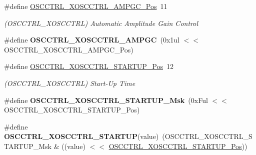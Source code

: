 \begin{DoxyCompactItemize}
\item 
\hypertarget{group___s_a_m_l21___o_s_c_c_t_r_l_gaa8295ae40610c6b9181afdd65394fee4}{}\#define \hyperlink{group___s_a_m_l21___o_s_c_c_t_r_l_gaa8295ae40610c6b9181afdd65394fee4}{O\+S\+C\+C\+T\+R\+L\+\_\+\+X\+O\+S\+C\+C\+T\+R\+L\+\_\+\+A\+M\+P\+G\+C\+\_\+\+Pos}~11\label{group___s_a_m_l21___o_s_c_c_t_r_l_gaa8295ae40610c6b9181afdd65394fee4}

\begin{DoxyCompactList}\small\item\em (O\+S\+C\+C\+T\+R\+L\+\_\+\+X\+O\+S\+C\+C\+T\+R\+L) Automatic Amplitude Gain Control \end{DoxyCompactList}\item 
\hypertarget{group___s_a_m_l21___o_s_c_c_t_r_l_gaf8a7d56c7b927eadd55d46bef85392d1}{}\#define {\bfseries O\+S\+C\+C\+T\+R\+L\+\_\+\+X\+O\+S\+C\+C\+T\+R\+L\+\_\+\+A\+M\+P\+G\+C}~(0x1ul $<$$<$ O\+S\+C\+C\+T\+R\+L\+\_\+\+X\+O\+S\+C\+C\+T\+R\+L\+\_\+\+A\+M\+P\+G\+C\+\_\+\+Pos)\label{group___s_a_m_l21___o_s_c_c_t_r_l_gaf8a7d56c7b927eadd55d46bef85392d1}

\item 
\hypertarget{group___s_a_m_l21___o_s_c_c_t_r_l_ga4e50b7ee8f0aed0e3ffaf064b9febc35}{}\#define \hyperlink{group___s_a_m_l21___o_s_c_c_t_r_l_ga4e50b7ee8f0aed0e3ffaf064b9febc35}{O\+S\+C\+C\+T\+R\+L\+\_\+\+X\+O\+S\+C\+C\+T\+R\+L\+\_\+\+S\+T\+A\+R\+T\+U\+P\+\_\+\+Pos}~12\label{group___s_a_m_l21___o_s_c_c_t_r_l_ga4e50b7ee8f0aed0e3ffaf064b9febc35}

\begin{DoxyCompactList}\small\item\em (O\+S\+C\+C\+T\+R\+L\+\_\+\+X\+O\+S\+C\+C\+T\+R\+L) Start-\/\+Up Time \end{DoxyCompactList}\item 
\hypertarget{group___s_a_m_l21___o_s_c_c_t_r_l_gaabb769762ce45b357ca4242de9c674e5}{}\#define {\bfseries O\+S\+C\+C\+T\+R\+L\+\_\+\+X\+O\+S\+C\+C\+T\+R\+L\+\_\+\+S\+T\+A\+R\+T\+U\+P\+\_\+\+Msk}~(0x\+Ful $<$$<$ O\+S\+C\+C\+T\+R\+L\+\_\+\+X\+O\+S\+C\+C\+T\+R\+L\+\_\+\+S\+T\+A\+R\+T\+U\+P\+\_\+\+Pos)\label{group___s_a_m_l21___o_s_c_c_t_r_l_gaabb769762ce45b357ca4242de9c674e5}

\item 
\hypertarget{group___s_a_m_l21___o_s_c_c_t_r_l_gaafb8ed4ef716f656a9d843b276769150}{}\#define {\bfseries O\+S\+C\+C\+T\+R\+L\+\_\+\+X\+O\+S\+C\+C\+T\+R\+L\+\_\+\+S\+T\+A\+R\+T\+U\+P}(value)~(O\+S\+C\+C\+T\+R\+L\+\_\+\+X\+O\+S\+C\+C\+T\+R\+L\+\_\+\+S\+T\+A\+R\+T\+U\+P\+\_\+\+Msk \& ((value) $<$$<$ \hyperlink{group___s_a_m_l21___o_s_c_c_t_r_l_ga4e50b7ee8f0aed0e3ffaf064b9febc35}{O\+S\+C\+C\+T\+R\+L\+\_\+\+X\+O\+S\+C\+C\+T\+R\+L\+\_\+\+S\+T\+A\+R\+T\+U\+P\+\_\+\+Pos}))\label{group___s_a_m_l21___o_s_c_c_t_r_l_gaafb8ed4ef716f656a9d843b276769150}


\end{DoxyCompactItemize}
